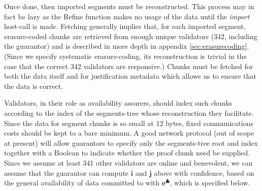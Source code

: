 Once done, then imported segments must be reconstructed. This process may in fact be lazy as the Refine function makes no usage of the data until the \emph{import} host-call is made. Fetching generally implies that, for each imported segment, erasure-coded chunks are retrieved from enough unique validators (342, including the guarantor) and is described in more depth in appendix \ref{sec:erasurecoding}. (Since we specify systematic erasure-coding, its reconstruction is trivial in the case that the correct 342 validators are responsive.) Chunks must be fetched for both the data itself and for justification metadata which allows us to ensure that the data is correct.

Validators, in their role as availability assurers, should index such chunks according to the index of the segments-tree whose reconstruction they facilitate. Since the data for segment chunks is so small at 12 bytes, fixed communications costs should be kept to a bare minimum. A good network protocol (out of scope at present) will allow guarantors to specify only the segments-tree root and index together with a Boolean to indicate whether the proof chunk need be supplied. Since we assume at least 341 other validators are online and benevolent, we can assume that the guarantor can compute $\mathbf{i}$ and $\mathbf{j}$ above with confidence, based on the general availability of data committed to with $\mathbf{e}^\clubsuit$, which is specified below.


